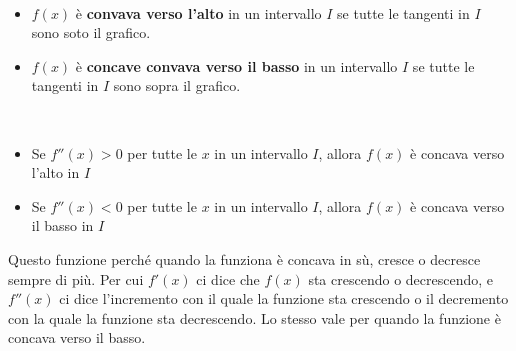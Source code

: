 \documentclass{article}
\begin{document}
\begin{minipage}{0.5\textwidth}
\end{minipage}
\begin{minipage}{0.5\textwidth}
    \phantom{ } \\
    \begin{itemize}
        \item \(f(x)\) è \textbf{convava verso l'alto} in un intervallo \(I\) se tutte le tangenti in \(I\) sono soto il grafico.
        \item \(f(x)\) è \textbf{concave convava verso il basso} in un intervallo \(I\) se tutte le tangenti in \(I\) sono sopra il grafico.
    \end{itemize}
    \hphantom{ } \\
    \begin{itemize}
        \item Se \(f''(x)>0\) per tutte le \(x\) in un intervallo \(I\), allora \(f(x)\) è concava verso l'alto in \(I\)
        \item Se \(f''(x)<0\) per tutte le \(x\) in un intervallo \(I\), allora \(f(x)\) è concava verso il basso in \(I\)
    \end{itemize}

    Questo funzione perché quando la funziona è concava in sù, cresce o decresce sempre di più. Per cui \(f'(x)\) 
    ci dice che \(f(x)\) sta crescendo o decrescendo, e \(f''(x)\) ci dice l'incremento con il quale la funzione
    sta crescendo o il decremento con la quale la funzione sta decrescendo.
    Lo stesso vale per quando la funzione è concava verso il basso.
\end{minipage}
\end{document}
